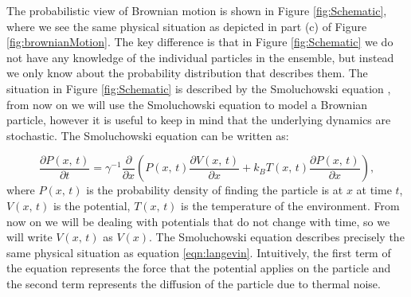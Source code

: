 The probabilistic view of Brownian motion is shown in Figure \ref{fig:Schematic}, where we see the same physical situation as depicted in part (c) of Figure \ref{fig:brownianMotion}. The key difference is that in Figure \ref{fig:Schematic} we do not have any knowledge of the individual particles in the ensemble, but instead we only know about the probability distribution that describes them. The situation in Figure \ref{fig:Schematic} is described by the Smoluchowski equation \cite{Gardiner2009}, from now on we will use the Smoluchowski equation to model a Brownian particle, however it is useful to keep in mind that the underlying dynamics are stochastic. The Smoluchowski equation can be written as:

\begin{equation}
\frac{\partial P(x, \, t)}{\partial t} =  \gamma^{-1} \frac{\partial}{\partial x} \left (P(x, \, t) \frac{\partial V(x, \, t)}{\partial x} + k_B T(x,  \, t) \frac{\partial P(x, \, t)}{\partial x} \right ), \label{eqn:smoluchowskiIntro}
\end{equation}
where $P(x, \, t)$ is the probability density of finding the particle is at $x$ at time $t$, $V(x, \, t )$ is the potential, $T(x, \, t)$ is the temperature of the environment. From now on we will be dealing with potentials that do not change with time, so we will write $V(x, \, t)$ as $V(x)$. The Smoluchowski equation describes precisely the same physical situation as equation \ref{eqn:langevin}. Intuitively, the first term of the equation represents the force that the potential applies on the particle and the second term represents the diffusion of the particle due to thermal noise.

